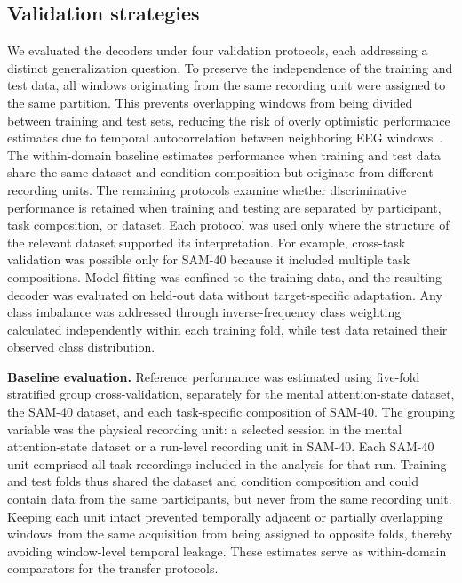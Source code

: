 \documentclass[10pt,letterpaper]{article}
\newcommand{\rev}[1]{#1}
\newcommand{\revs}[1]{#1}
\begin{document}


\subsection*{\revs{Validation strategies}}

\rev{We evaluated the decoders under four validation protocols, each addressing a distinct generalization question. To preserve the independence of the training and test data, all windows originating from the same recording unit were assigned to the same partition. This prevents overlapping windows from being divided between training and test sets, reducing the risk of overly optimistic performance estimates due to temporal autocorrelation between neighboring EEG windows~\cite{chen2025hybrid}. The within-domain baseline estimates performance when training and test data share the same dataset and condition composition but originate from different recording units. The remaining protocols examine whether discriminative performance is retained when training and testing are separated by participant, task composition, or dataset. Each protocol was used only where the structure of the relevant dataset supported its interpretation. For example, cross-task validation was possible only for SAM-40 because it included multiple task compositions. Model fitting was confined to the training data, and the resulting decoder was evaluated on held-out data without target-specific adaptation. Any class imbalance was addressed through inverse-frequency class weighting calculated independently within each training fold, while test data retained their observed class distribution.}

\textbf{Baseline evaluation.}
\rev{Reference performance was estimated using five-fold stratified group cross-validation, separately for the mental attention-state dataset, the SAM-40 dataset, and each task-specific composition of SAM-40. The grouping variable was the physical recording unit: a selected session in the mental attention-state dataset or a run-level recording unit in SAM-40. Each SAM-40 unit comprised all task recordings included in the analysis for that run. Training and test folds thus shared the dataset and condition composition and could contain data from the same participants, but never from the same recording unit. Keeping each unit intact prevented temporally adjacent or partially overlapping windows from the same acquisition from being assigned to opposite folds, thereby avoiding window-level temporal leakage. These estimates serve as within-domain comparators for the transfer protocols.}
\end{document}
